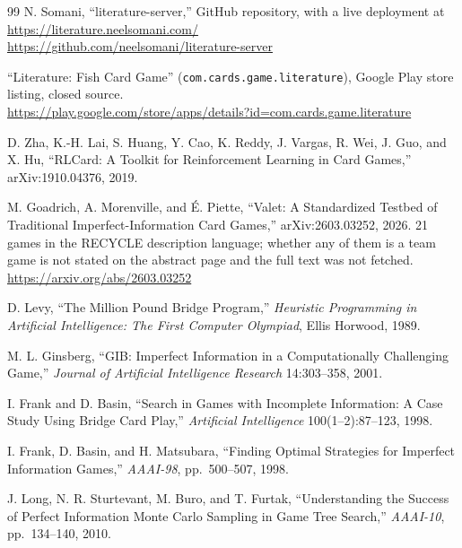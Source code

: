 \begin{thebibliography}{99}
N. Somani, ``literature-server,'' GitHub repository, with a live deployment at
\url{https://literature.neelsomani.com/}\\
\url{https://github.com/neelsomani/literature-server}

``Literature: Fish Card Game'' (\texttt{com.cards.game.literature}), Google Play
store listing, closed source.\\
\url{https://play.google.com/store/apps/details?id=com.cards.game.literature}

D. Zha, K.-H. Lai, S. Huang, Y. Cao, K. Reddy, J. Vargas, R. Wei, J. Guo, and
X. Hu, ``RLCard: A Toolkit for Reinforcement Learning in Card Games,''
arXiv:1910.04376, 2019.

M. Goadrich, A. Morenville, and \'E. Piette, ``Valet: A Standardized Testbed of
Traditional Imperfect-Information Card Games,'' arXiv:2603.03252, 2026.
21 games in the RECYCLE description language; whether any of them is a team game
is not stated on the abstract page and the full text was not fetched.\\
\url{https://arxiv.org/abs/2603.03252}


D. Levy, ``The Million Pound Bridge Program,'' \emph{Heuristic Programming in
Artificial Intelligence: The First Computer Olympiad}, Ellis Horwood, 1989.

M. L. Ginsberg, ``GIB: Imperfect Information in a Computationally Challenging
Game,'' \emph{Journal of Artificial Intelligence Research} 14:303--358, 2001.

I. Frank and D. Basin, ``Search in Games with Incomplete Information: A Case
Study Using Bridge Card Play,'' \emph{Artificial Intelligence}
100(1--2):87--123, 1998.

I. Frank, D. Basin, and H. Matsubara, ``Finding Optimal Strategies for Imperfect
Information Games,'' \emph{AAAI-98}, pp.~500--507, 1998.

J. Long, N. R. Sturtevant, M. Buro, and T. Furtak, ``Understanding the Success
of Perfect Information Monte Carlo Sampling in Game Tree Search,''
\emph{AAAI-10}, pp.~134--140, 2010.


\end{thebibliography}
